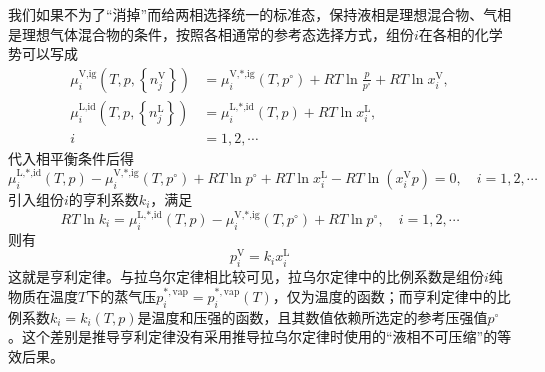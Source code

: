 \documentclass[main.tex]{subfiles}
\begin{document}
我们如果不为了“消掉”而给两相选择统一的标准态，保持液相是理想混合物、气相是理想气体混合物的条件，按照各相通常的参考态选择方式，组份$i$在各相的化学势可以写成
\begin{align*}
  \mu_i^\text{V,ig}\left(T,p,\left\{n_j^\text{V}\right\}\right) & =\mu_i^\text{V,*,ig}\left(T,p^\circ\right)+RT\ln\frac{p}{p^\circ}+RT\ln x_i^\text{V}, \\
  \mu_i^\text{L,id}\left(T,p,\left\{n_j^\text{L}\right\}\right) & =\mu_i^\text{L,*,id}\left(T,p\right)+RT\ln x_i^\text{L},                              \\
  i                                                             & =1,2,\cdots
\end{align*}
代入相平衡条件后得
\[
  \mu_i^\text{L,*,id}\left(T,p\right)-\mu_i^\text{V,*,ig}\left(T,p^\circ\right)+RT\ln p^\circ+RT\ln x_i^\text{L}-RT\ln\left(x_i^\text{V}p\right)=0,\quad i=1,2,\cdots
\]
引入组份$i$的亨利系数$k_i$，满足
\[RT\ln k_i=\mu_i^\text{L,*,id}\left(T,p\right)-\mu_i^\text{V,*,ig}\left(T,p^\circ\right)+RT\ln p^\circ,\quad i=1,2,\cdots\]
则有
\[p_i^\text{V}=k_ix_i^\text{L}\]
这就是亨利定律。与拉乌尔定律相比较可见，拉乌尔定律中的比例系数是组份$i$纯物质在温度$T$下的蒸气压$p_i^{*,\text{vap}}=p_i^{*,\text{vap}}\left(T\right)$，仅为温度的函数；而亨利定律中的比例系数$k_i=k_i\left(T,p\right)$是温度和压强的函数，且其数值依赖所选定的参考压强值$p^\circ$。这个差别是推导亨利定律没有采用推导拉乌尔定律时使用的“液相不可压缩”的等效后果。
\end{document}
